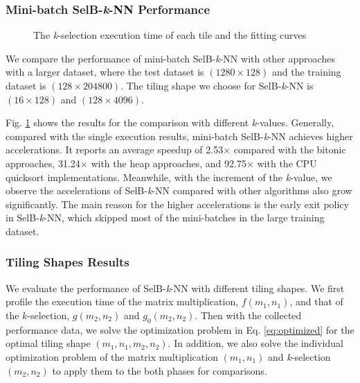 \documentclass[12pt]{extbook}
\begin{document}
\subsubsection{Mini-batch SelB-\textit{k}-NN Performance}

\begin{figure}[tbp]
    \caption{The \textit{k}-selection execution time of each tile and the fitting curves}
    \label{fig:multi_results}
    \end{figure}

We compare the performance of mini-batch SelB-\textit{k}-NN with other approaches with a larger dataset, where the test dataset is $(1280 \times 128)$ and the training dataset is $(128 \times 204800)$. The tiling shape we choose for SelB-\textit{k}-NN is $(16 \times 128)$ and $(128 \times 4096)$. 

Fig. \ref{fig:multi_results} shows the results for the comparison with different \textit{k}-values. Generally, compared with the single execution results, mini-batch SelB-\textit{k}-NN achieves higher accelerations. It reports an average speedup of 2.53$\times$ compared with the bitonic approaches, 31.24$\times$ with the heap approaches, and 92.75$\times$ with the CPU quicksort implementations. Meanwhile, with the increment of the \textit{k}-value, we observe the accelerations of SelB-\textit{k}-NN compared with other algorithms also grow significantly. The main reason for the higher accelerations is the early exit policy in SelB-\textit{k}-NN, which skipped most of the mini-batches in the large training dataset. 

\subsubsection{Tiling Shapes Results}

We evaluate the performance of SelB-\textit{k}-NN with different tiling shapes. We first profile the execution time of the matrix multiplication, $f(m_1, n_1)$, and that of the $k$-selection, $g(m_2, n_2)$ and $g_{0}(m_2, n_2)$. Then with the collected performance data, we solve the optimization problem in Eq. \ref{eq:optimized} for the optimal tiling shape $(m_1, n_1, m_2, n_2)$. In addition, we also solve the individual optimization problem of the matrix multiplication $(m_1, n_1)$ and \textit{k}-selection $(m_2, n_2)$ to apply them to the both phases for comparisons.
\end{document}
